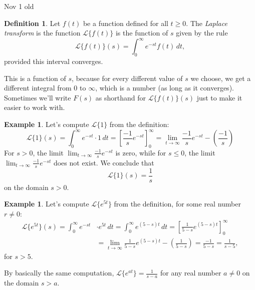 \documentclass[12pt]{amsart}
\numberwithin{equation}{section}
\theoremstyle{plain} %
\newcommand{\Nov}[1]{Nov #1 old}
\theoremstyle{definition}
\newtheorem{defn}[equation]{Definition}
\newtheorem{ex}[equation]{Example}
\theoremstyle{remark}
\newcommand{\LA}[1]{\mathcal{L}\{ #1 \}}
\begin{document}
\Nov{1}

\begin{defn} Let $f(t)$ be a function defined for all $t\geq 0$. The \emph{Laplace transform} is the function $\LA{f(t)}$ is the function of $s$ given by the rule
\[ \LA{f(t)}(s) = \int_0^\infty e^{-st} f(t) \, dt,\]
provided this interval converges.
\end{defn}

This is a function of $s$, because for every different value of $s$ we choose, we get a different integral from $0$ to $\infty$, which is a number (as long as it converges). Sometimes we'll write $F(s)$ as shorthand for $ \LA{f(t)}(s)$ just to make it easier to work with.


\begin{ex} Let's compute $\LA{1}$ from the definition:
\[ \LA{1}(s) = \int_0^\infty e^{-st} \cdot 1 \, dt = \left[ \frac{-1}{s} e^{-st} \right]_{0}^{\infty} = \lim_{t\to\infty}\frac{-1}{s} e^{-st} - \left(\frac{-1}{s}\right)\]
For $s>0$, the limit $\lim_{t\to\infty}\frac{-1}{s} e^{-st}$ is zero, while for $s \leq 0$, the limit $\lim_{t\to\infty}\frac{-1}{s} e^{-st}$ does not exist. We conclude that
\[ \LA{1}(s) = \frac{1}{s}\]
on the domain $s>0$.
\end{ex}

\begin{ex} Let's compute $\LA{e^{5t}}$ from the definition, for some real number $r\neq 0$:
\begin{align*} \LA{e^{5t}}(s) = \int_0^\infty e^{-st} &\cdot e^{5t} \, dt = \int_0^\infty e^{(5-s)t} \, dt = \left[ \frac{1}{5-s} e^{(5-s)t} \right]_{0}^{\infty} \\&= \lim_{t\to\infty}\frac{1}{5-s} e^{(5-s)t} - \left(\frac{1}{5-s}\right) = \frac{-1}{5-s} = \frac{1}{s-5},\end{align*}
for $s>5$.

By basically the same computation, $\LA{e^{at}} = \frac{1}{s-a}$ for any real number $a\neq 0$ on the domain $s>a$.
\end{ex}

\renewcommand{\arraystretch}{2.5}
\end{document}
